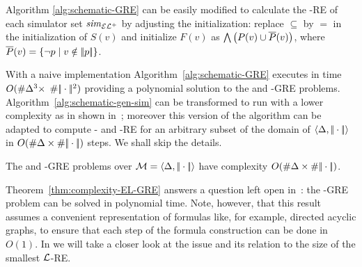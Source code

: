 Algorithm \ref{alg:schematic-GRE} can be easily modified to
calculate the \ELAN-RE of each simulator set ${\it sim}_{{\mathcal{EL}^+}}$ by
adjusting the initialization: replace $\subseteq$ by $=$ in the
initialization of $S(v)$ and initialize $F(v)$ as
$\bigwedge\left(P(v)\cup\overline {P}(v)\right)$,
where $\overline {P}(v)=\{\lnot p\mid v\notin|\!|p|\!|\}$.


With a naive implementation Algorithm~\ref{alg:schematic-GRE}
executes in time $O(\# \Delta^3\times$
$\# |\!|\cdot|\!|^2)$
providing a polynomial solution to the \EL and \ELAN-GRE problems.
Algorithm~\ref{alg:schematic-gen-sim} can be transformed to run with a lower complexity
as in shown in~\cite{HHK95}; moreover this version of the algorithm can be adapted to
compute \EL- and \ELAN-RE for an arbitrary subset of the domain of $\langle \Delta,|\!|\cdot|\!|\rangle$
 in $O(\# \Delta\times\# |\!|\cdot|\!|)$ steps. We shall skip the details.


%

%
\begin{theorem}\label{thm:complexity-EL-GRE}
The \EL and \ELAN-GRE problems over $\mathcal{M}=\langle \Delta,|\!|\cdot|\!|\rangle$ have complexity
$O(\# \Delta\times\# |\!|\cdot|\!|)$.
\end{theorem}

Theorem~\ref{thm:complexity-EL-GRE} answers a question left open
in~\cite{AKS08}: the \EL-GRE problem can be solved in polynomial
time. Note, however, that this  result assumes a convenient representation of
formulas like, for example, directed acyclic graphs, to ensure that
each step of the formula construction can be done in $O(1)$. In
 we will take a closer look at the issue and its relation to
the size of the smallest $\mathcal{L}$-RE.





